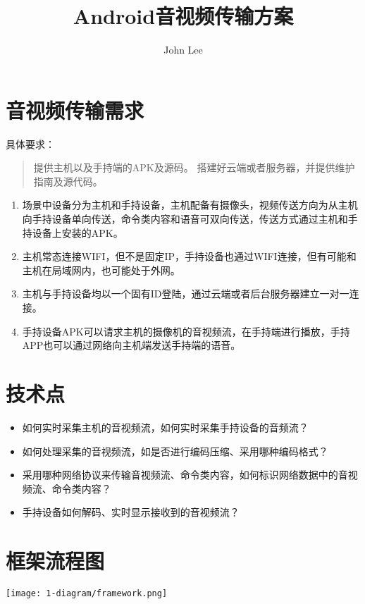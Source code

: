 \documentclass[11pt,a4paper]{article}
\begin{document}
\begin{CJK}{UTF8}{gbsn}
    \title{Android音视频传输方案}
    \author{John Lee}
    \maketitle

    \section{音视频传输需求}
    具体要求：
    \begin{quote}
        提供主机以及手持端的APK及源码。
        搭建好云端或者服务器，并提供维护指南及源代码。
    \end{quote}
    \begin{enumerate}
        \item 场景中设备分为主机和手持设备，主机配备有摄像头，视频传送方向为从主机向手持设备单向传送，命令类内容和语音可双向传送，传送方式通过主机和手持设备上安装的APK。
        \item 主机常态连接WIFI，但不是固定IP，手持设备也通过WIFI连接，但有可能和主机在局域网内，也可能处于外网。
        \item 主机与手持设备均以一个固有ID登陆，通过云端或者后台服务器建立一对一连接。
        \item 手持设备APK可以请求主机的摄像机的音视频流，在手持端进行播放，手持APP也可以通过网络向主机端发送手持端的语音。
    \end{enumerate}

    \section{技术点}
    \begin{itemize}
        \item 如何实时采集主机的音视频流，如何实时采集手持设备的音频流？
        \item 如何处理采集的音视频流，如是否进行编码压缩、采用哪种编码格式？
        \item 采用哪种网络协议来传输音视频流、命令类内容，如何标识网络数据中的音视频流、命令类内容？
        \item 手持设备如何解码、实时显示接收到的音视频流？
    \end{itemize}

    \section{框架流程图}
    \begin{center}
        \texttt{[image: 1-diagram/framework.png]}
    \end{center}


\end{CJK}
\end{document}
